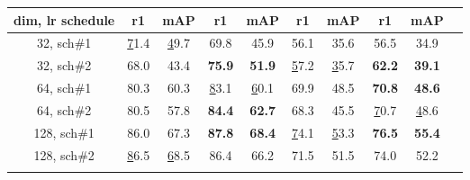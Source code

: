 \documentclass[10pt,twocolumn,letterpaper]{article}
\begin{document}
\begin{table}[t]
{\begin{tabular}{cccccccccc}
                \multicolumn{1}{c}{dim, lr schedule} & \multicolumn{1}{c}{r1} & \multicolumn{1}{c}{mAP} & \multicolumn{1}{c}{r1} & \multicolumn{1}{c}{mAP} & \multicolumn{1}{c}{r1} & \multicolumn{1}{c}{mAP} & \multicolumn{1}{c}{r1} & \multicolumn{1}{c}{mAP} \\
\midrule
32, sch\#1                          & {\ul 71.4}             & {\ul 49.7}              & 69.8                   & 45.9                    & 56.1                   & 35.6                    & 56.5                   & 34.9                    \\
                      32, sch\#2                          & 68.0                   & 43.4                    & \textbf{75.9}          & \textbf{51.9}           & {\ul 57.2}             & {\ul 35.7}              & \textbf{62.2}          & \textbf{39.1}           \\
                     \midrule
 64, sch\#1                          & 80.3                   & 60.3                    & {\ul 83.1}             & {\ul 60.1}              & 69.9                   & 48.5                    & \textbf{70.8}          & \textbf{48.6}           \\
                      64, sch\#2                          & 80.5                   & 57.8                    & \textbf{84.4}          & \textbf{62.7}           & 68.3                   & 45.5                    & {\ul 70.7}             & {\ul 48.6}              \\
                     \midrule
 128, sch\#1                          & 86.0                   & 67.3                    & \textbf{87.8}          & \textbf{68.4}           & {\ul 74.1}             & {\ul 53.3}              & \textbf{76.5}          & \textbf{55.4}           \\
                      128, sch\#2                          & {\ul 86.5}             & {\ul 68.5}              & 86.4                   & 66.2                    & 71.5                   & 51.5                    & 74.0                   & 52.2        \\           
\Xhline{3\arrayrulewidth}
\end{tabular}
}
\vspace{-5mm}
\end{table}





 
\end{document}
